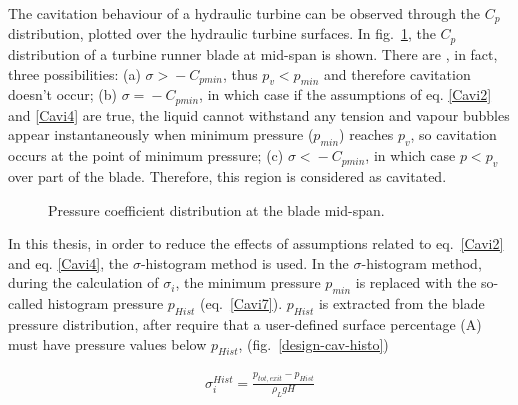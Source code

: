 The cavitation behaviour of a hydraulic turbine can be observed through the $C_p$ distribution, plotted over the hydraulic turbine surfaces.  In fig.\ \ref{design-cav-cp}, the $C_p$ distribution of a turbine runner blade at mid-span is shown. There are , in fact, three possibilities: (a) $\sigma\!>\!-C_{pmin}$, thus $p_v\!<\!p_{min}$ and therefore cavitation doesn't occur; (b)  $\sigma\!=\!-C_{pmin}$, in which case if the assumptions of eq. \ref{Cavi2} and \ref{Cavi4} are true, the liquid cannot withstand any tension and vapour bubbles appear instantaneously when minimum pressure ($p_{min}$) reaches $p_{v}$, so cavitation occurs at the point of minimum pressure; (c) $\sigma\!<\!-C_{pmin}$, in which case $p\!<\!p_v$ over  part of the blade. Therefore, this region is considered as cavitated.     

\begin{figure}[h!]
\begin{minipage}[b]{1\linewidth}
 \centering
\end{minipage}
\caption{Pressure coefficient distribution at the blade mid-span.}
\label{design-cav-cp}
\end{figure}

In this thesis, in order to reduce the effects of assumptions related to eq.\ \ref{Cavi2} and eq. \ref{Cavi4}, the $\sigma$-histogram method \cite{Schmidl} is used. In the $\sigma$-histogram method, during the calculation of $\sigma_i$, the minimum pressure $p_{min}$ is replaced with the  so-called histogram pressure $p_{Hist}$ (eq.\ \ref{Cavi7}). $p_{Hist}$ is extracted from the blade pressure distribution, after require that a user-defined surface percentage (A) must have pressure values below $p_{Hist}$, (fig.\ \ref{design-cav-histo})  

\begin{eqnarray}
		\sigma_i^{Hist}=\frac{p_{tot,exit}-p_{Hist}}{\rho_{L}gH}
\label{Cavi7}
\end{eqnarray}

